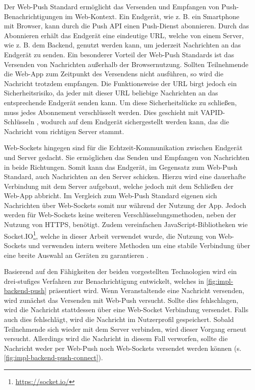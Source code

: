 Der Web-Push Standard ermöglicht das Versenden und Empfangen von
Push-Benach\-richti\-gungen im Web-Kontext. Ein Endgerät, wie z. B. ein Smartphone
mit Browser, kann durch die Push API einen Push-Dienst abonnieren. Durch das
Abonnieren erhält das Endgerät eine eindeutige URL, welche von einem Server, wie
z. B. dem Backend, genutzt werden kann, um jederzeit Nachrichten an das Endgerät
zu senden. Ein besonderer Vorteil der Web-Push Standards ist das Versenden von
Nachrichten außerhalb der Browsernutzung. Sollten Teilnehmende die Web-App zum
Zeitpunkt des Versendens nicht ausführen, so wird die Nachricht trotzdem
empfangen. Die Funktionsweise der URL birgt jedoch ein Sicherheitsrisiko, da
jeder mit dieser URL beliebige Nachrichten an das entsprechende Endgerät senden
kann. Um diese Sicherheitslücke zu schließen, muss jedes Abonnement
verschlüsselt werden. Dies geschieht mit VAPID-Schlüsseln \cite{VAPID}, wodurch
auf dem Endgerät sichergestellt werden kann, das die Nachricht vom richtigen
Server stammt.

Web-Sockets hingegen sind für die Echtzeit-Kommunikation zwischen Endgerät und
Server gedacht. Sie ermöglichen das Senden und Empfangen von Nachrichten in
beide Richtungen. Somit kann das Endgerät, im Gegensatz zum Web-Push Standard,
auch Nachrichten an den Server schicken. Hierzu wird eine dauerhafte Verbindung
mit dem Server aufgebaut, welche jedoch mit dem Schließen der Web-App abbricht.
Im Vergleich zum Web-Push Standard eigenen sich Nachrichten über Web-Sockets
somit nur während der Nutzung der App. Jedoch werden für Web-Sockets keine
weiteren Verschlüsselungsmethoden, neben der Nutzung von HTTPS, benötigt. Zudem
vereinfachen JavaScript-Bibliotheken wie Socket.IO\footnote{\url{https://socket.io/}},
welche in dieser Arbeit verwendet wurde, die Nutzung von Web-Sockets und
verwenden intern weitere Methoden um eine stabile Verbindung über eine
breite Auswahl an Geräten zu garantieren \cite{SocketIO2022}.


Basierend auf den Fähigkeiten der beiden vorgestellten Technologien wird ein
drei-stufiges Verfahren zur Benachrichtigung entwickelt, welches in
\autoref{fig:impl-backend-push} präsentiert wird. Wenn Veranstaltende eine
Nachricht versenden, wird zunächst das Versenden mit Web-Push versucht. Sollte
dies fehlschlagen, wird die Nachricht stattdessen über eine Web-Socket
Verbindung versendet. Falls auch dies fehlschlägt, wird die Nachricht im
Nutzerprofil gespeichert. Sobald Teilnehmende sich wieder mit dem Server
verbinden, wird dieser Vorgang erneut versucht. Allerdings wird die Nachricht in
diesem Fall verworfen, sollte die Nachricht weder per Web-Push noch Web-Sockets
versendet werden können (s. \autoref{fig:impl-backend-push-connect}).

